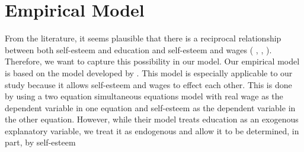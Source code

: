 \documentclass[12pt]{report}
\newcommand{\citee}[1]{\citename{#1} \citeyear{#1}}
\begin{document}
\chapter{Empirical Model}


\begin{comment} This section will discuss what we changed about the GVD model and provide justification for these changes. It will also contain a presentation of the empirical model.
\end{comment}

From the literature, it seems plausible that there is a reciprocal relationship between both self-esteem and education and self-esteem and wages (\citee{RSS1989}, \citee{W1999}, \citee{BO1977}). Therefore, we want to capture this possibility in our model. Our empirical model is based on the model developed by \citee{GVD1997}. This model is especially applicable to our study because it allows self-esteem and wages to effect each other. This is done by using a two equation simultaneous equations model with real wage as the dependent variable in one equation and self-esteem as the dependent variable in the other equation. However, while their model treats education as an exogenous explanatory variable, we treat it as endogenous and allow it to be determined, in part, by self-esteem
\end{document}
